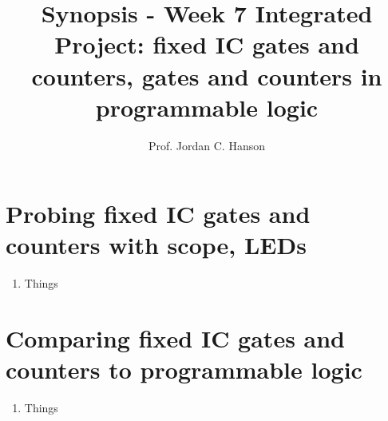 \documentclass{article}
\begin{document}
\title{Synopsis - Week 7 Integrated Project: fixed IC gates and counters, gates and counters in programmable logic}
\author{Prof. Jordan C. Hanson}

\maketitle

\section{Probing fixed IC gates and counters with scope, LEDs}

\begin{enumerate}
\item Things
\end{enumerate}

\section{Comparing fixed IC gates and counters to programmable logic}

\begin{enumerate}
\item Things
\end{enumerate}
\end{document}
